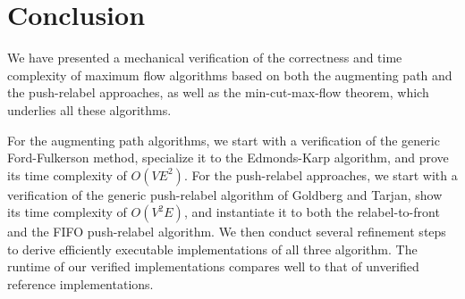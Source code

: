 \documentclass[smallcondensed]{svjour3}     %
\begin{document}
% 
%   
  
% 
% 
    
    

\section{Conclusion}\label{sec:concl}
  We have presented a mechanical verification of the correctness and time complexity of maximum flow algorithms based on both 
  the augmenting path and the push-relabel approaches, as well as the min-cut-max-flow theorem, which underlies all these algorithms.
  
  For the augmenting path algorithms, we start with a verification of the generic Ford-Fulkerson method, 
  specialize it to the Edmonds-Karp algorithm, and prove its time complexity of $O(VE^2)$.
  For the push-relabel approaches, we start with a verification of the generic push-relabel algorithm of Goldberg and Tarjan, show its time complexity of $O(V^2E)$, and
  instantiate it to both the relabel-to-front and the FIFO push-relabel algorithm.
  We then conduct several refinement steps to derive efficiently executable implementations of all three algorithm.
  The runtime of our verified implementations compares well to that of unverified reference implementations.
  
\end{document}
